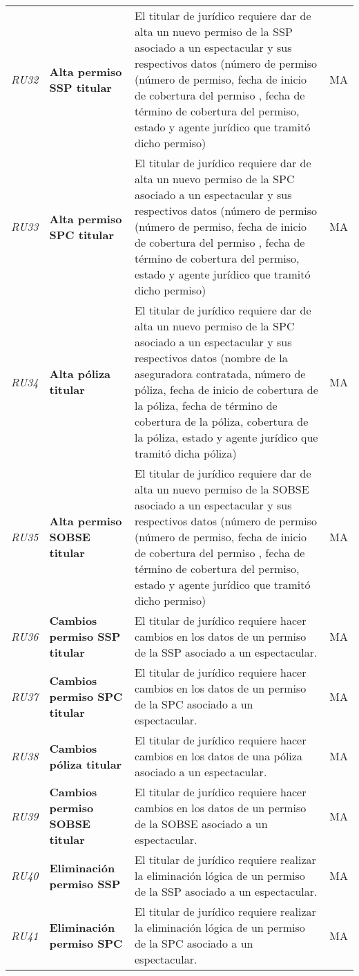 \begin{longtable}[H]{m{2cm}m{3cm}m{5cm}m{2cm}}
\textit{RU32} &\textbf{Alta permiso SSP titular} & El titular de jurídico requiere dar de alta un nuevo permiso de la SSP asociado a un espectacular y sus respectivos datos (número de permiso (número de permiso, fecha de inicio de cobertura del permiso , fecha de término de cobertura del permiso, estado y agente jurídico que tramitó dicho permiso) & MA\tabularnewline
\textit{RU33} &\textbf{Alta permiso SPC titular} & El titular de jurídico requiere dar de alta un nuevo permiso de la SPC asociado a un espectacular y sus respectivos datos (número de permiso (número de permiso, fecha de inicio de cobertura del permiso , fecha de término de cobertura del permiso, estado y agente jurídico que tramitó dicho permiso) & MA\tabularnewline
\textit{RU34} &\textbf{Alta póliza titular} & El titular de jurídico requiere dar de alta un nuevo permiso de la SPC asociado a un espectacular y sus respectivos datos (nombre de la aseguradora contratada, número de póliza, fecha de inicio de cobertura de la póliza, fecha de término de cobertura de la póliza, cobertura de la póliza, estado y agente jurídico que tramitó dicha póliza) & MA\tabularnewline
\textit{RU35} &\textbf{Alta permiso SOBSE titular} & El titular de jurídico requiere dar de alta un nuevo permiso de la SOBSE asociado a un espectacular y sus respectivos datos (número de permiso (número de permiso, fecha de inicio de cobertura del permiso , fecha de término de cobertura del permiso, estado y agente jurídico que tramitó dicho permiso) & MA\tabularnewline
\textit{RU36} &\textbf{Cambios permiso SSP titular} & El titular de jurídico requiere hacer cambios en los datos de un permiso de la SSP asociado a un espectacular. & MA\tabularnewline
\textit{RU37} &\textbf{Cambios permiso SPC titular} & El titular de jurídico requiere hacer cambios en los datos de un permiso de la SPC asociado a un espectacular. & MA\tabularnewline
\textit{RU38} &\textbf{Cambios póliza titular} & El titular de jurídico requiere hacer cambios en los datos de una póliza asociado a un espectacular. & MA\tabularnewline
\textit{RU39} &\textbf{Cambios permiso SOBSE titular} & El titular de jurídico requiere hacer cambios en los datos de un permiso de la SOBSE asociado a un espectacular. & MA\tabularnewline
\textit{RU40} &\textbf{Eliminación permiso SSP} & El titular de jurídico requiere realizar la eliminación lógica de un permiso de la SSP asociado a un espectacular. & MA\tabularnewline
\textit{RU41} &\textbf{Eliminación permiso SPC} & El titular de jurídico requiere realizar la eliminación lógica de un permiso de la SPC asociado a un espectacular. & MA\tabularnewline

\end{longtable}
